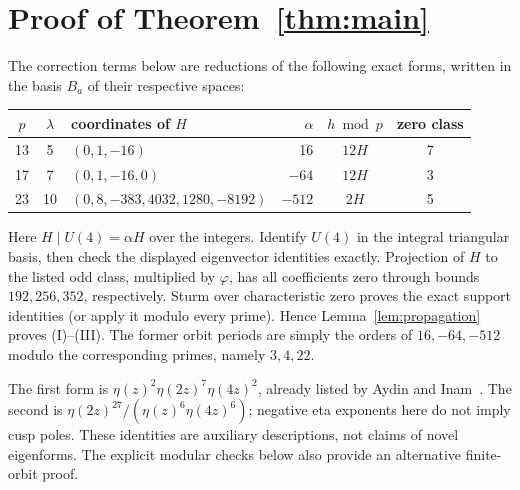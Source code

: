 \documentclass[11pt]{article}
\theoremstyle{remark}\newtheorem{remark}[theorem]{Remark}
\begin{document}
\section{Proof of Theorem~\ref{thm:main}}
The correction terms below are reductions of the following exact forms, written in the basis $B_a$ of their respective spaces:
\begin{center}\small
\begin{tabular}{c c l r c c}
$p$&$\lambda$&coordinates of $H$&$\alpha$&$h\bmod p$&zero class\\\hline
13&5&$(0,1,-16)$&16&$12H$&7\\
17&7&$(0,1,-16,0)$&$-64$&$12H$&3\\
23&10&$(0,8,-383,4032,1280,-8192)$&$-512$&$2H$&5
\end{tabular}
\end{center}
Here $H\mid U(4)=\alpha H$ over the integers. Identify $U(4)$ in the integral triangular basis, then check the displayed eigenvector identities exactly. Projection of $H$ to the listed odd class, multiplied by $\varphi$, has all coefficients zero through bounds $192,256,352$, respectively. Sturm over characteristic zero proves the exact support identities (or apply it modulo every prime). Hence Lemma~\ref{lem:propagation} proves (I)--(III). The former orbit periods are simply the orders of $16,-64,-512$ modulo the corresponding primes, namely $3,4,22$.

The first form is $\eta(z)^2\eta(2z)^7\eta(4z)^2$, already listed by Aydin and Inam~\cite[Table 1, no.~43]{AI}. The second is $\eta(2z)^{27}/(\eta(z)^6\eta(4z)^6)$; negative eta exponents here do not imply cusp poles. These identities are auxiliary descriptions, not claims of novel eigenforms. The explicit modular checks below also provide an alternative finite-orbit proof.
\end{document}
